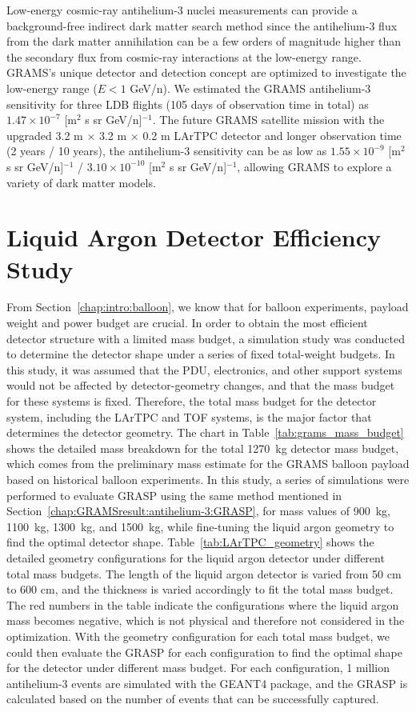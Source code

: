 Low-energy cosmic-ray antihelium-3 nuclei measurements can provide a background-free indirect dark matter search method since the antihelium-3 flux from the dark matter annihilation can be a few orders of magnitude higher than the secondary flux from cosmic-ray interactions at the low-energy range. GRAMS's unique detector and detection concept are optimized to investigate the low-energy range ($E < 1$ GeV/n). We estimated the GRAMS antihelium-3 sensitivity for three LDB flights (105 days of observation time in total) as $1.47\times10^{-7}$ [m$^2$ s sr GeV/n]$^{-1}$. The future GRAMS satellite mission with the upgraded 3.2 m $\times$ 3.2 m $\times$ 0.2 m LArTPC detector and longer observation time (2 years / 10 years), the antihelium-3 sensitivity can be as low as $ 1.55\times10^{-9}$ [m$^2$ s sr GeV/n]$^{-1}$ / $3.10\times10^{-10}$ [m$^2$ s sr GeV/n]$^{-1}$, allowing GRAMS to explore a variety of dark matter models.


\section{Liquid Argon Detector Efficiency Study}
\label{chap:GRAMSresult:TPCshape}
From Section~\ref{chap:intro:balloon}, we know that for balloon experiments, payload weight and power budget are crucial. In order to obtain the most efficient detector structure with a limited mass budget, a simulation study was conducted to determine the detector shape under a series of fixed total-weight budgets. In this study, it was assumed that the \ac{PDU}, electronics, and other support systems would not be affected by detector-geometry changes, and that the mass budget for these systems is fixed. Therefore, the total mass budget for the detector system, including the \ac{LArTPC} and \ac{TOF} systems, is the major factor that determines the detector geometry. The chart in Table~\ref{tab:grams_mass_budget} shows the detailed mass breakdown for the total 1270~kg detector mass budget, which comes from the preliminary mass estimate for the GRAMS balloon payload based on historical balloon experiments. In this study, a series of simulations were performed to evaluate GRASP using the same method mentioned in Section~\ref{chap:GRAMSresult:antihelium-3:GRASP}, for mass values of 900~kg, 1100~kg, 1300~kg, and 1500~kg, while fine-tuning the liquid argon geometry to find the optimal detector shape. Table~\ref{tab:LArTPC_geometry} shows the detailed geometry configurations for the liquid argon detector under different total mass budgets. The length of the liquid argon detector is varied from 50 cm to 600 cm, and the thickness is varied accordingly to fit the total mass budget. The red numbers in the table indicate the configurations where the liquid argon mass becomes negative, which is not physical and therefore not considered in the optimization. With the geometry configuration for each total mass budget, we could then evaluate the GRASP for each configuration to find the optimal shape for the detector under different mass budget. For each configuration, 1 million antihelium-3 events are simulated with the GEANT4 package, and the GRASP is calculated based on the number of events that can be successfully captured.

